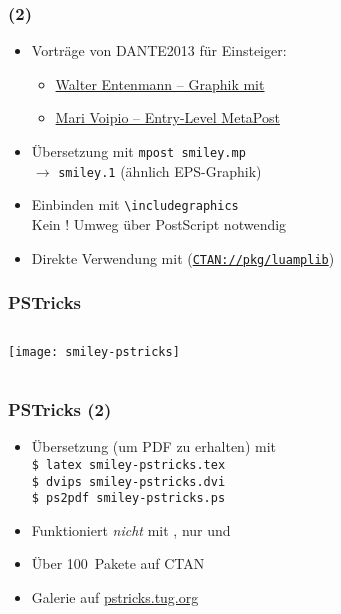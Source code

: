 \begin{frame}
  \frametitle{ (2)}
  \begin{itemize}
  \item Vorträge von DANTE2013 für Einsteiger:
    \begin{itemize}
    \item
      \href{http://www.dante.de/events/dante2013/Programm/Vortraege/folien-entenmann.pdf}{Walter
      Entenmann – Graphik mit }
    \item
      \href{http://www.dante.de/events/dante2013/Programm/Vortraege/folien-voipio.pdf}{Mari
      Voipio – Entry-Level MetaPost}
    \end{itemize}
    \item Übersetzung mit \texttt{mpost smiley.mp}\\
    $\rightarrow$ \texttt{smiley.1} (ähnlich EPS-Graphik)
  \item Einbinden mit \texttt{\textbackslash includegraphics}\\
    Kein !  Umweg über PostScript notwendig
  \item Direkte Verwendung mit  (\texttt{\href{http://ctan.org/pkg/luamplib}{CTAN://pkg/luamplib}})
  \end{itemize}
\end{frame}

\begin{frame}
  \frametitle{PSTricks}
  \begin{columns}[T]
    \begin{column}{.25\textwidth}
      \texttt{[image: smiley-pstricks]}
    \end{column}
    \begin{column}{.75\textwidth}
      TeX}]{examples/graphics/smiley-pstricks.tex}
    \end{column}
  \end{columns}
\end{frame}

\begin{frame}
  \frametitle{PSTricks (2)}
  \begin{itemize}
  \item Übersetzung (um PDF zu erhalten) mit\\
    \texttt{\$ latex smiley-pstricks.tex}\\
    \texttt{\$ dvips smiley-pstricks.dvi}\\
    \texttt{\$ ps2pdf smiley-pstricks.ps}
  \item Funktioniert \emph{nicht} mit , nur
     und 
  \item Über 100~Pakete auf CTAN
  \item Galerie auf \href{http://pstricks.tug.org}{pstricks.tug.org}
  \end{itemize}
  \begingroup
  \printbibliography[heading=none,keyword=graphic]
  \endgroup
\end{frame}

